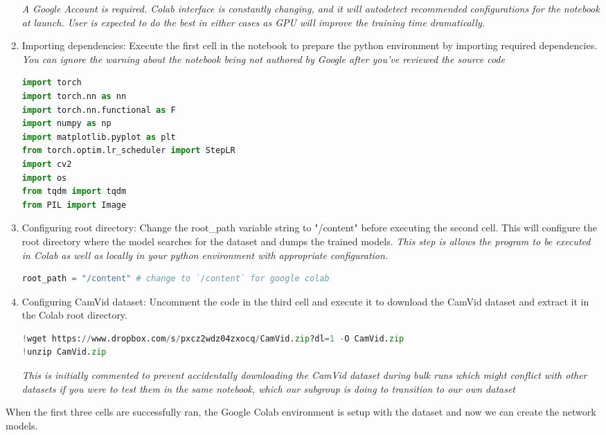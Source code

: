 \begin{enumerate}
	      \textit{A Google Account is required. Colab interface is constantly changing, and it will autodetect recommended configurations for the notebook at launch. User is expected to do the best in either cases as GPU will improve the training time dramatically.}
	\item Importing dependencies: Execute the first cell in the notebook to prepare the python environment by importing required dependencies. \textit{You can ignore the warning about the notebook being not authored by Google after you've reviewed the source code}
	      \begin{lstlisting}[language=Python]
import torch
import torch.nn as nn
import torch.nn.functional as F
import numpy as np
import matplotlib.pyplot as plt
from torch.optim.lr_scheduler import StepLR
import cv2
import os
from tqdm import tqdm
from PIL import Image
        \end{lstlisting}
	\item Configuring root directory: Change the root\_path variable string to "/content" before executing the second cell. This will configure the root directory where the model searches for the dataset and dumps the trained models. \textit{This step is allows the program to be executed in Colab as well as locally in your python environment with appropriate configuration.}
	      \begin{lstlisting}[language=Python]
root_path = "/content" # change to `/content` for google colab
        \end{lstlisting}
	\item Configuring CamVid dataset: Uncomment the code in the third cell and execute it to download the CamVid dataset and extract it in the Colab root directory.
	      \begin{lstlisting}[language=Python]
!wget https://www.dropbox.com/s/pxcz2wdz04zxocq/CamVid.zip?dl=1 -O CamVid.zip
!unzip CamVid.zip
        \end{lstlisting}
	      \textit{This is initially commented to prevent accidentally downloading the CamVid dataset during bulk runs which might conflict with other datasets if you were to test them in the same notebook, which our subgroup is doing to transition to our own dataset}

\end{enumerate}
When the first three cells are successfully ran, the Google Colab environment is setup with the dataset and now we can create the network models.
